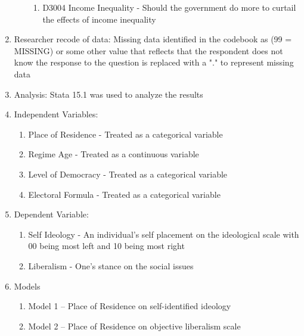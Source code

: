 \documentclass[12pt]{article}
\begin{document}
\begin{enumerate}
\begin{enumerate}
\begin{enumerate}
		\item D3004 Income Inequality - Should the government do more to curtail the effects of income inequality
	\end{enumerate}
\end{enumerate}
\item Researcher recode of data: Missing data identified in the codebook as (99 = MISSING) or some other value that reflects that the respondent does not know the response to the question is replaced with a "." to represent missing data
\item Analysis: Stata 15.1 was used to analyze the results
\item Independent Variables:
\begin{enumerate}
	\item Place of Residence - Treated as a categorical variable
	\item Regime Age - Treated as a continuous variable
	\item Level of Democracy - Treated as a categorical variable
	\item Electoral Formula - Treated as a categorical variable
\end{enumerate}
\item Dependent Variable:
\begin{enumerate}
	\item Self Ideology - An individual's self placement on the ideological scale with 00 being most left and 10 being most right
	\item Liberalism - One's stance on the social issues
\end{enumerate}
\item Models 
\begin{enumerate}
	\item Model 1 -- Place of Residence on self-identified ideology
	\item Model 2 -- Place of Residence on objective liberalism scale
\end{enumerate}
\end{enumerate}

\clearpage
\nocite{*}


\end{document}

